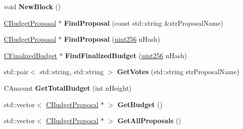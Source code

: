 \begin{DoxyCompactItemize}
\item 
\mbox{\label{class_c_budget_manager_a9c62c8f18b6f101465415952349ce203}} 
void {\bfseries New\+Block} ()
\item 
\mbox{\label{class_c_budget_manager_a185f3408172582919cf072835e716373}} 
\mbox{\hyperlink{class_c_budget_proposal}{C\+Budget\+Proposal}} $\ast$ {\bfseries Find\+Proposal} (const std\+::string \&str\+Proposal\+Name)
\item 
\mbox{\label{class_c_budget_manager_a239d05bfaeb5ec1309134aac3be316ec}} 
\mbox{\hyperlink{class_c_budget_proposal}{C\+Budget\+Proposal}} $\ast$ {\bfseries Find\+Proposal} (\mbox{\hyperlink{classuint256}{uint256}} n\+Hash)
\item 
\mbox{\label{class_c_budget_manager_a26ebbe767534cce413810d7e7a1bf78c}} 
\mbox{\hyperlink{class_c_finalized_budget}{C\+Finalized\+Budget}} $\ast$ {\bfseries Find\+Finalized\+Budget} (\mbox{\hyperlink{classuint256}{uint256}} n\+Hash)
\item 
\mbox{\label{class_c_budget_manager_a71b8c43385a284f15398074617fa4104}} 
std\+::pair$<$ std\+::string, std\+::string $>$ {\bfseries Get\+Votes} (std\+::string str\+Proposal\+Name)
\item 
\mbox{\label{class_c_budget_manager_a3c6bc6278e7f394b6bfabbe757466e70}} 
C\+Amount {\bfseries Get\+Total\+Budget} (int n\+Height)
\item 
\mbox{\label{class_c_budget_manager_acba591312f675bd37692e69410ff5735}} 
std\+::vector$<$ \mbox{\hyperlink{class_c_budget_proposal}{C\+Budget\+Proposal}} $\ast$ $>$ {\bfseries Get\+Budget} ()
\item 
\mbox{\label{class_c_budget_manager_af2e50d4662f6c18b7ac7e26b021adc6c}} 
std\+::vector$<$ \mbox{\hyperlink{class_c_budget_proposal}{C\+Budget\+Proposal}} $\ast$ $>$ {\bfseries Get\+All\+Proposals} ()
\item 
\mbox{\label{class_c_budget_manager_ab806fb2d22db385f22bc9655e09b2944}} 

\end{DoxyCompactItemize}
